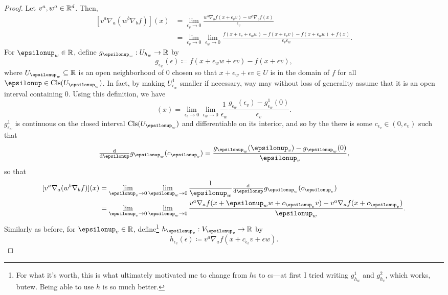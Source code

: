 \begin{thm}
\begin{proof}
Let $v^a,w^a\in \mathbb{R} ^d$.  Then,
\begin{equation}
\begin{split}
[v^a\nabla _a(w^b\nabla _bf)](x) & =\lim _{\epsilon _v\to 0}\frac{w^b\nabla _bf(x+\epsilon _vv)-w^b\nabla _bf(x)}{\epsilon _v} \\
& =\lim _{\epsilon _v\to 0}\lim _{\epsilon _w\to 0}\frac{f(x+\epsilon _v+\epsilon _ww)-f(x+\epsilon _vv)-f(x+\epsilon _ww)+f(x)}{\epsilon _v\epsilon _w}.
\end{split}
\end{equation}
For $\epsilon _w\in \R$, define $g_{\epsilon _w}:U_{h_w}\rightarrow \R$ by
\begin{equation}
g_{\epsilon _w}(\epsilon )\coloneqq f(x+\epsilon _ww+\epsilon v)-f(x+\epsilon v),
\end{equation}
where $U_{\epsilon _w}\subseteq \R $ is an open neighborhood of $0$ chosen so that $x+\epsilon _w+\epsilon v\in U$ is in the domain of $f$ for all $\epsilon \in \Cls (U_{\epsilon _w})$.  In fact, by making $U_{\epsilon _w}^1$ smaller if necessary, way may without loss of generality assume that it is an open interval containing $0$.  Using this definition, we have
\begin{equation}
[v^a\nabla _a(w^b\nabla _bf)](x)=\lim _{\epsilon _v\to 0}\lim _{\epsilon _w\to 0}\frac{1}{\epsilon _w}\frac{g_{\epsilon _w}(\epsilon _v)-g_{\epsilon _w}^1(0)}{\epsilon _v}.
\end{equation}
$g_{\epsilon _w}^1$ is continuous on the closed interval $\Cls (U_{\epsilon _w})$ and differentiable on its interior, and so by the  there is some $c_{\epsilon _v}\in (0,\epsilon _v)$ such that
\begin{equation}
\tfrac{\dif}{\dif \epsilon}g_{\epsilon _w}(c_{\epsilon _v})=\frac{g_{\epsilon _w}(\epsilon _v)-g_{\epsilon _w}(0)}{\epsilon _v},
\end{equation}
so that
\begin{equation}
\begin{split}
[v^a\nabla _a(w^b\nabla _bf)](x) & =\lim _{\epsilon _v\to 0}\lim _{\epsilon _w\to 0}\frac{1}{\epsilon _w}\tfrac{\dif}{\dif \epsilon}g_{\epsilon _w}(c_{\epsilon _v}) \\
& =\lim _{\epsilon _v\to 0}\lim _{\epsilon _w\to 0}\frac{v^a\nabla _af(x+\epsilon _ww+c_{\epsilon _v}v)-v^a\nabla _af(x+c_{\epsilon _v})}{\epsilon _w}.
\end{split}
\end{equation}
Similarly as before, for $\epsilon _v\in \R$, define\footnote{For what it's worth, this is what ultimately motivated me to change from $h$s to $\epsilon$s---at first I tried writing $g_{h_w}^1$ and $g_{h_v}^2$, which works, but\textellipsis ew.  Being able to use $h$ is so much better.} $h_{\epsilon _v}:V_{\epsilon _v}\rightarrow \R$ by
\begin{equation}
h_{\epsilon _v}(\epsilon )\coloneqq v^a\nabla _af(x+c_{\epsilon _v}v+\epsilon w).
\end{equation}


\end{proof}
\end{thm}
